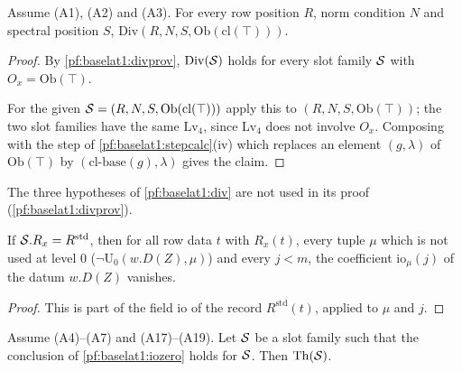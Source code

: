 \begin{proposition}\label{pf:baselat1:div}
Assume (A1), (A2) and (A3). For every row
position $R$, norm condition $N$ and spectral position $S$,
$\mathrm{Div}(R,N,S,\mathrm{Ob}(\mathrm{cl}(\top)))$.
\end{proposition}

\begin{proof}
By \cref{pf:baselat1:divprov}, $\mathrm{Div}(\mathcal S)$ holds for every slot family $\mathcal S$ with
$O_x=\mathrm{Ob}(\top)$.

For the given $\mathcal S=(R,N,S,\mathrm{Ob}(\mathrm{cl}(\top)))$ apply this to
$(R,N,S,\mathrm{Ob}(\top))$; the two slot families have the same $\mathrm{Lv}_4$, since
$\mathrm{Lv}_4$ does not involve $O_x$. Composing with the step of \cref{pf:baselat1:stepcalc}(iv) which
replaces an element $(g,\lambda)$ of $\mathrm{Ob}(\top)$ by
$(\mathrm{cl}\text{-base}(g),\lambda)$ gives the claim.
\end{proof}

\begin{remark}\label{pf:baselat1:rem:div}
The three hypotheses of \cref{pf:baselat1:div} are not used in its proof
(\cref{pf:baselat1:divprov}).
\end{remark}

\begin{lemma}\label{pf:baselat1:iozero}
If $\mathcal S.R_x=R^{\mathrm{std}}$, then for all row data $t$ with $R_x(t)$, every tuple $\mu$ which is not
used at level $0$ ($\neg\mathrm{U}_0(w.D(Z),\mu)$) and every $j<m$, the coefficient
$\mathrm{io}_\mu(j)$ of the datum $w.D(Z)$ vanishes.
\end{lemma}

\begin{proof}
This is part of the field $\mathrm{io}$ of the record $R^{\mathrm{std}}(t)$, applied to $\mu$ and $j$.
\end{proof}

\begin{proposition}\label{pf:baselat1:theta}
Assume (A4)--(A7) and (A17)--(A19). Let $\mathcal S$ be a slot family such that the conclusion of
\cref{pf:baselat1:iozero} holds for $\mathcal S$. Then $\mathrm{Th}(\mathcal S)$.
\end{proposition}

